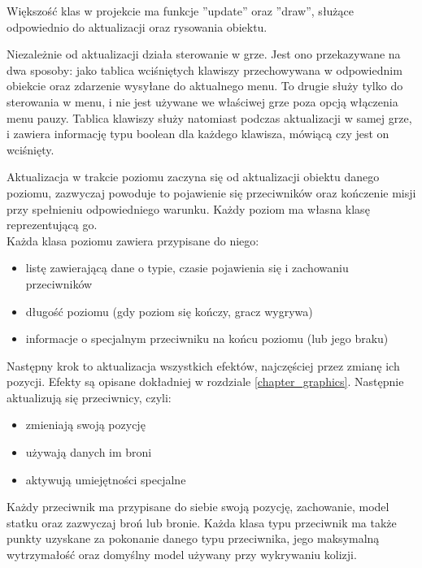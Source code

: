 Większo\'sć klas w projekcie ma funkcje ''update'' oraz ''draw'', służące odpowiednio do aktualizacji oraz rysowania obiektu.

Niezależnie od aktualizacji działa sterowanie w grze. Jest ono przekazywane na dwa sposoby: jako tablica wci\'sniętych klawiszy przechowywana w odpowiednim obiekcie oraz zdarzenie wysyłane do aktualnego menu. To drugie służy tylko do sterowania w menu, i nie jest używane we wła\'sciwej grze poza opcją włączenia menu pauzy. Tablica klawiszy służy natomiast podczas aktualizacji w samej grze, i zawiera informację typu boolean dla każdego klawisza, mówiącą czy jest on wci\'snięty.\bigskip

\smallskip

Aktualizacja w trakcie poziomu zaczyna się od aktualizacji obiektu danego poziomu, zazwyczaj powoduje to pojawienie się przeciwników oraz kończenie misji przy spełnieniu odpowiedniego warunku. Każdy poziom ma własna klasę reprezentującą go.\\
Każda klasa poziomu zawiera przypisane do niego: \begin{itemize}[topsep=0.2em, itemsep=0.5em, partopsep=0em, parsep=0em]
	\item listę zawierającą dane o typie, czasie pojawienia się i zachowaniu przeciwników
	\item długo\'sć poziomu (gdy poziom się kończy, gracz wygrywa)
	\item informacje o specjalnym przeciwniku na końcu poziomu (lub jego braku)
\end{itemize}\smallskip

\noindent Następny krok to aktualizacja wszystkich efektów, najczę\'sciej przez zmianę ich pozycji. Efekty są opisane dokładniej w rozdziale \ref{chapter_graphics}.\newpage
\noindent Następnie aktualizują się przeciwnicy, czyli:\begin{itemize}[topsep=0.2em, itemsep=0.5em, partopsep=0em, parsep=0em]
	\item zmieniają swoją pozycję
	\item używają danych im broni
	\item aktywują umiejętno\'sci specjalne
\end{itemize}
Każdy przeciwnik ma przypisane do siebie swoją pozycję, zachowanie, model statku oraz zazwyczaj broń lub bronie. Każda klasa typu przeciwnik ma także punkty uzyskane za pokonanie danego typu przeciwnika, jego maksymalną wytrzymało\'sć  oraz domy\'slny model używany przy wykrywaniu kolizji.\smallskip

